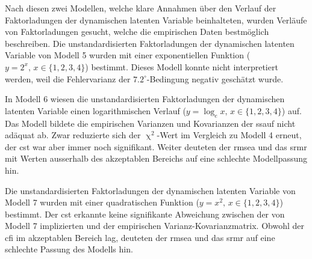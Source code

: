 \documentclass[11pt, twoside, a4paper]{book}		%
\begin{document}
Nach diesen zwei Modellen, welche klare Annahmen über den Verlauf der Faktorladungen der dynamischen latenten Variable beinhalteten, wurden Verläufe von Faktorladungen gesucht, welche die empirischen Daten bestmöglich beschreiben.
Die unstandardisierten Faktorladungen der dynamischen latenten Variable von Modell 5 wurden mit einer exponentiellen Funktion ($y=2^x,\,x\in\{1, 2, 3, 4\}$) bestimmt. Dieses Modell konnte nicht interpretiert werden, weil die Fehlervarianz der $7.2^{\circ}$-Bedingung negativ geschätzt wurde. 

In Modell 6 wiesen die unstandardisierten Faktorladungen der dynamischen latenten Variable einen logarithmischen Verlauf ($y=\log_{e}x,\,x\in\{1, 2, 3, 4\}$) auf. Das Modell bildete die empirischen Varianzen und Kovarianzen der \gls{ssauf} nicht adäquat ab. Zwar reduzierte sich der $\upchi^2$-Wert im Vergleich zu Modell 4 erneut, der \gls{cst} war aber immer noch signifikant. Weiter deuteten der \gls{rmsea} und das \gls{srmr} mit Werten ausserhalb des akzeptablen Bereichs auf eine schlechte Modellpassung hin.

Die unstandardisierten Faktorladungen der dynamischen latenten Variable von Modell 7 wurden mit einer quadratischen Funktion ($y=x^2,\,x\in\{1, 2, 3, 4\}$) bestimmt. Der \gls{cst} erkannte keine signifikante Abweichung zwischen der von Modell 7 implizierten und der empirischen Var\-ianz-Ko\-var\-ianz\-ma\-trix. Obwohl der \gls{cfi} im akzeptablen Bereich lag, deuteten der \gls{rmsea} und das \gls{srmr} auf eine schlechte Passung des Modells hin.
\end{document}
